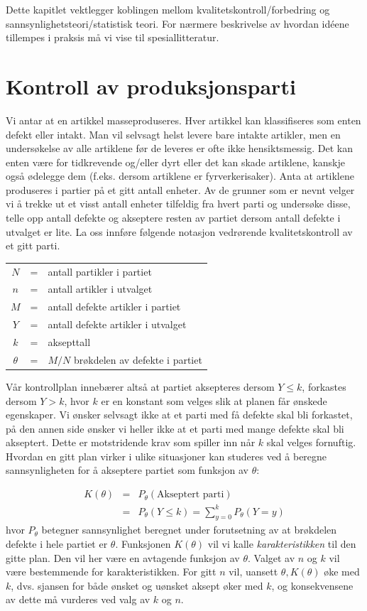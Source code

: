Dette kapitlet vektlegger koblingen mellom kvalitetskontroll/forbedring og
sannsynlighetsteori/statistisk teori. For nærmere beskrivelse av hvordan
id\'{e}ene tillempes i praksis må vi vise til spesiallitteratur.



\section{Kontroll av produksjonsparti}
Vi antar at en artikkel masseproduseres.  Hver artikkel kan klassifiseres som
enten defekt eller intakt.  Man vil selvsagt helst levere bare intakte 
artikler, men en undersøkelse av alle artiklene før de leveres er ofte
ikke hensiktsmessig.  Det kan enten være for tidkrevende og/eller dyrt
eller det kan skade artiklene, kanskje også ødelegge dem (f.eks.
dersom artiklene er fyrverkerisaker).  Anta at artiklene produseres i partier
på et gitt antall enheter.  Av de grunner som er nevnt velger vi å
trekke ut et visst antall enheter tilfeldig fra hvert parti og undersøke
disse, telle opp antall defekte og akseptere resten av partiet dersom antall 
defekte i utvalget er lite.  La oss innføre følgende notasjon 
vedrørende kvalitetskontroll av et gitt parti.
\begin{center}
\begin{tabular}{ccl}
   $N$ & = & antall partikler i partiet\\
   $n$ & = & antall artikler i utvalget \\
   $M$ & = & antall defekte artikler i partiet \\
   $Y$ & = & antall defekte artikler i utvalget \\
   $k$ & = & aksepttall \\
$\theta $& = &$M/N$ brøkdelen av defekte i partiet
\end{tabular}
\end{center}
\noindent Vår kontrollplan innebærer altså at partiet aksepteres
dersom $Y\leq k$, forkastes dersom $Y>k$, hvor $k$ er en konstant som velges slik
at planen får ønskede egenskaper.  Vi ønsker selvsagt ikke at 
et parti med få defekte skal bli forkastet, på den annen side 
ønsker vi heller ikke at et parti med mange defekte skal bli akseptert.
Dette er motstridende krav som spiller inn når $k$ skal velges fornuftig.
Hvordan en gitt plan virker i ulike situasjoner kan studeres ved å 
beregne sannsynligheten for å akseptere partiet som funksjon av $\theta$:

\begin{eqnarray*}
K(\theta )&=&P_{\theta}(\mbox{Akseptert parti}) \\
          &=&P_{\theta}(Y\leq k)=\sum_{y=0}^k P_{\theta}(Y=y)
\end{eqnarray*}
\noindent hvor $P_{\theta}$ betegner sannsynlighet beregnet under forutsetning
av at brøkdelen defekte i hele partiet er $\theta$. Funksjonen $K(\theta )$
vil vi kalle {\em karakteristikken} til den gitte plan.  Den vil her være
en avtagende funksjon av $\theta$.  Valget av $n$ og $k$ vil være 
bestemmende for karakteristikken.  For gitt $n$ vil, uansett $\theta, 
K(\theta )$ øke med $k$, dvs. sjansen for både ønsket og uønsket
aksept øker med $k$, og konsekvensene av dette må vurderes ved valg av
$k$ og $n$.

